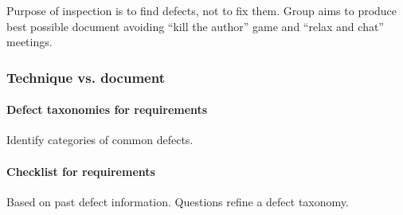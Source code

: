 Purpose of inspection is to find defects, not to fix them. Group aims to produce best possible document avoiding ``kill the author'' game and ``relax and chat'' meetings.

\subsubsection{Technique vs. document}
\paragraph{Defect taxonomies for requirements}
Identify categories of common defects.

\begin{Parallel}{0.45\textwidth}{0.45\textwidth}
\end{Parallel}

\paragraph{Checklist for requirements}
Based on past defect information. Questions refine a defect taxonomy.

